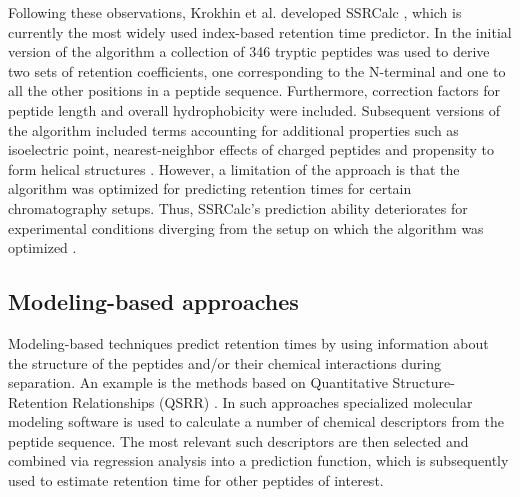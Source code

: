 \documentclass[a4paper]{article}
\begin{document}
Following these observations, Krokhin et al. developed
SSRCalc \cite{Krokhin2004}, which is currently the most widely used
index-based retention time predictor. In the initial version of the
algorithm a collection of 346 tryptic peptides was used to derive two
sets of retention coefficients, one corresponding to the N-terminal
and one to all the other positions in a peptide sequence. Furthermore,
correction factors for peptide length and overall hydrophobicity were
included. Subsequent versions of the algorithm included terms
accounting for additional properties such as isoelectric point,
nearest-neighbor effects of charged peptides and propensity to form
helical structures \cite{Krokhin2006}. However, a limitation of the
approach is that the algorithm was optimized for predicting retention
times for certain chromatography setups. Thus, SSRCalc's prediction
ability deteriorates for experimental conditions diverging from the
setup on which the algorithm was optimized \cite{Spicer2007}.



\subsection{Modeling-based approaches}

Modeling-based techniques predict retention times by using information
about the structure of the peptides and/or their chemical interactions
during separation. An example is the methods based on Quantitative
Structure-Retention Relationships (QSRR) \cite{Kaliszan2005,
Baczek2005}. In such approaches specialized molecular modeling
software is used to calculate a number of chemical descriptors from
the peptide sequence. The most relevant such descriptors are then
selected and combined via regression analysis into a prediction
function, which is subsequently used to estimate retention time for
other peptides of interest.
\end{document}
